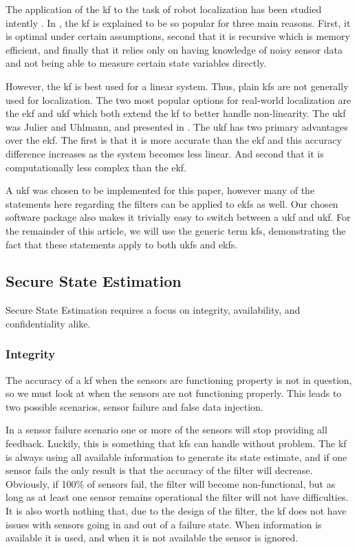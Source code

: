 \documentclass[conference]{IEEEtran}
\begin{document}
The application of the \gls{kf} to the task of robot localization has been studied intently \cite{Localization2003, Mohsin2014}. In \cite{Mohsin2014}, the \gls{kf} is explained to be so popular for three main reasons. First, it is optimal under certain assumptions, second that it is recursive which is memory efficient, and finally that it relies only on having knowledge of noisy sensor data and not being able to measure certain state variables directly.

However, the \gls{kf} is best used for a linear system. Thus, plain \glspl{kf} are not generally used for localization. The two most popular options for real-world localization are the \gls{ekf} and \gls{ukf} which both extend the \gls{kf} to better handle non-linearity. The \gls{ukf} was Julier and Uhlmann, and presented in \cite{Julier1997}. The \gls{ukf} has two primary advantages over the \gls{ekf}. The first is that it is more accurate than the \gls{ekf} and this accuracy difference increases as the system becomes less linear. And second that it is computationally less complex than the \gls{ekf}.

A \gls{ukf} was chosen to be implemented for this paper, however many of the statements here regarding the filters can be applied to \glspl{ekf} as well. Our chosen software package also makes it trivially easy to switch between a \gls{ukf} and \gls{ukf}. For the remainder of this article, we will use the generic term \glspl{kf}, demonstrating the fact that these statements apply to both \glspl{ukf} and \glspl{ekf}.

\subsection{Secure State Estimation}
Secure State Estimation requires a focus on integrity, availability, and confidentiality alike.

\subsubsection{Integrity}
The accuracy of a \gls{kf} when the sensors are functioning property is not in question, so we must look at when the sensors are not functioning properly. This leads to two possible scenarios, sensor failure and false data injection.

In a sensor failure scenario one or more of the sensors will stop providing all feedback. Luckily, this is something that \glspl{kf} can handle without problem. The \gls{kf} is always using all available information to generate its state estimate, and if one sensor fails the only result is that the accuracy of the filter will decrease. Obviously, if 100\% of sensors fail, the filter will become non-functional, but as long as at least one sensor remains operational the filter will not have difficulties. It is also worth nothing that, due to the design of the filter, the \gls{kf} does not have issues with sensors going in and out of a failure state. When information is available it is used, and when it is not available the sensor is ignored.
\end{document}
